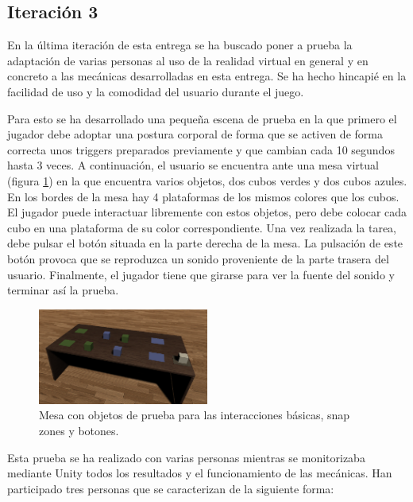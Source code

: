 
\subsection{Iteración 3}

En la última iteración de esta entrega se ha buscado poner a prueba la adaptación de varias personas al uso de la realidad virtual en general y en concreto a las mecánicas desarrolladas en esta entrega. Se ha hecho hincapié en la facilidad de uso y la comodidad del usuario durante el juego. 

Para esto se ha desarrollado una pequeña escena de prueba en la que primero el jugador debe adoptar una postura corporal de forma que se activen de forma correcta unos triggers preparados previamente y que cambian cada 10 segundos hasta 3 veces. A continuación, el usuario se encuentra ante una mesa virtual (figura \ref{fig:E2_mesa}) en la que encuentra varios objetos, dos cubos verdes y dos cubos azules. En los bordes de la mesa hay 4 plataformas de los mismos colores que los cubos. El jugador puede interactuar libremente con estos objetos, pero debe colocar cada cubo en una plataforma de su color correspondiente. Una vez realizada la tarea, debe pulsar el botón situada en la parte derecha de la mesa. La pulsación de este botón provoca que se reproduzca un sonido proveniente de la parte trasera del usuario. Finalmente, el jugador tiene que girarse para ver la fuente del sonido y terminar así la prueba.


\begin{figure}
  \centering
    \includegraphics[width=0.5\textwidth]{04.Desarrollo/02.Entrega2/03.Iteracion2_3/00.Figuras/01.mesa.png}
    \caption{Mesa con objetos de prueba para las interacciones básicas, snap zones y botones.}
    \label{fig:E2_mesa}
\end{figure}




Esta prueba se ha realizado con varias personas mientras se monitorizaba mediante Unity todos los resultados y el funcionamiento de las mecánicas. Han participado tres personas que se caracterizan de la siguiente forma:

